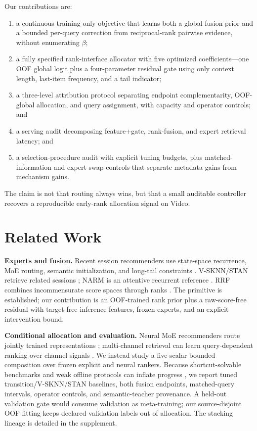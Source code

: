\documentclass[runningheads]{llncs}
\begin{document}
Our contributions are:
\begin{enumerate}
\item a continuous training-only objective that learns both a global fusion
prior and a bounded per-query correction from reciprocal-rank pairwise
evidence, without enumerating $\beta$;
\item a fully specified rank-interface allocator with five optimized coefficients---one
OOF global logit plus a four-parameter residual gate using only context length,
last-item frequency, and a tail indicator;
\item a three-level attribution protocol separating endpoint complementarity,
OOF-global allocation, and query assignment, with capacity and operator
controls; and
\item a serving audit decomposing feature+gate, rank-fusion, and expert
retrieval latency; and
\item a selection-procedure audit with explicit tuning budgets, plus
matched-information and expert-swap controls that separate metadata gains
from mechanism gains.
\end{enumerate}
The claim is not that routing always wins, but that a small auditable
controller recovers a reproducible early-rank allocation signal on Video.

\section{Related Work}
\textbf{Experts and fusion.}
Recent session recommenders use state-space recurrence, MoE routing, semantic
initialization, and long-tail constraints
\cite{sigma2025,hm2rec2026,llm2rec2025,hidlongtail2026}. V-SKNN/STAN retrieve
related sessions \cite{ludewig2018vsknn,garg2019stan}; NARM is an attentive
recurrent reference \cite{li2017narm}. RRF combines incommensurate score
spaces through ranks \cite{cormack2009rrf}. The primitive is established; our
contribution is an OOF-trained rank prior plus a raw-score-free residual with
target-free inference features, frozen experts, and an explicit intervention
bound.

\textbf{Conditional allocation and evaluation.}
Neural MoE recommenders route jointly trained representations
\cite{hm2rec2026}; multi-channel retrieval can learn query-dependent ranking
over channel signals \cite{multichannelltr2026}. We instead study a five-scalar
bounded composition over frozen explicit and neural rankers. Because
shortcut-solvable benchmarks and weak offline protocols can inflate progress
\cite{shortcut2026,standards2026}, we report tuned transition/V-SKNN/STAN
baselines, both fusion endpoints, matched-query intervals, operator controls,
and semantic-teacher provenance. A held-out validation gate would consume
validation as meta-training; our source-disjoint OOF fitting keeps declared
validation labels out of allocation. The stacking lineage is detailed in the
supplement.
\end{document}
